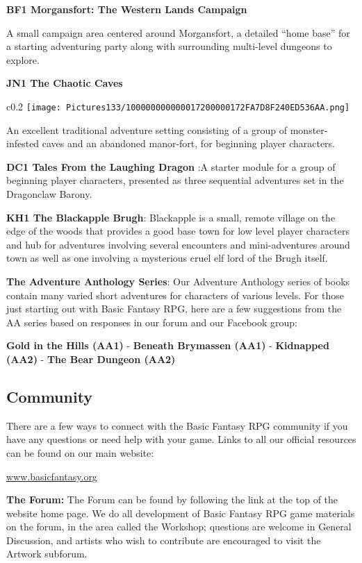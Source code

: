 \documentclass[a4paper,twoside,openany,10pt]{book}
\begin{document}
\textbf{BF1 Morgansfort: The Western Lands Campaign}

A small campaign area centered around Morgansfort, a detailed ``home base'' for a starting adventuring party along with surrounding multi-level dungeons to explore.

\textbf{JN1 The Chaotic Caves}

\begin{wrapfigure}{c}{0.2\textwidth}
	 \texttt{[image: Pictures133/100000000000017200000172FA7D8F240ED536AA.png]}  
\end{wrapfigure}


An excellent traditional adventure setting consisting of a group of monster-infested caves and an abandoned manor-fort, for beginning player characters.

\textbf{DC1 Tales From the Laughing Dragon} :A starter module for a group of beginning player characters, presented as three sequential adventures set in the Dragonclaw Barony.

\textbf{KH1 The Blackapple Brugh}: Blackapple is a small, remote village on the edge of the woods that provides a good base town for low level player characters and hub for adventures involving several encounters and mini-adventures around town as well as one involving a mysterious cruel elf lord of the Brugh itself.

\textbf{The Adventure Anthology Series}: Our Adventure Anthology series of books contain many varied short adventures for characters of various levels. For those just starting out with Basic Fantasy RPG, here are a few suggestions from the AA series based on responses in our forum and our Facebook group:

\textbf{Gold in the Hills (AA1)} - \textbf{Beneath Brymassen (AA1)} -  \textbf{Kidnapped (AA2)} - \textbf{The Bear Dungeon (AA2)}


\subsection{Community}\label{community}

There are a few ways to connect with the Basic Fantasy RPG community if you have any questions or need help with your game. Links to all our official resources can be found on our main website:

\href{www.basicfantasy.org}{www.basicfantasy.org}

\textbf{The Forum:} The Forum can be found by following the link at the top of the website home page. We do all development of Basic Fantasy RPG game materials on the forum, in the area called the Workshop; questions are welcome in General Discussion, and artists who wish to contribute are encouraged to visit the Artwork subforum.
\end{document}
